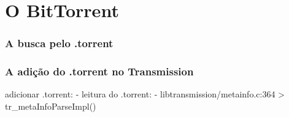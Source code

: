 \chapter{O BitTorrent}

\subsection{A busca pelo .torrent}

\subsection{A adição do .torrent no Transmission}

adicionar .torrent:
	- leitura do .torrent:
		- libtransmission/metainfo.c:364 > tr_metaInfoParseImpl()

